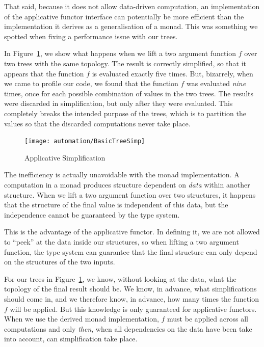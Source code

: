 That said, because it does not allow data-driven computation, an implementation of the applicative functor interface can potentially be more efficient than the implementation it derives as a generalisation of a monad. This was something we spotted when fixing a performance issue with our trees.

In Figure~\ref{fig:ApplicativeSimp}, we show what happens when we lift a two argument function $f$ over two trees with the same topology. The result is correctly simplified, so that it appears that the function $f$ is evaluated exactly five times. But, bizarrely, when we came to profile our code, we found that the function $f$ was evaluated \emph{nine} times, once for each possible combination of values in the two trees. The results were discarded in simplification, but only after they were evaluated. This completely breaks the intended purpose of the trees, which is to partition the values so that the discarded computations never take place.

\begin{figure}
\centering\texttt{[image: automation/BasicTreeSimp]}
\caption{Applicative Simplification}
\label{fig:ApplicativeSimp}
\end{figure}

The inefficiency is actually unavoidable with the monad implementation. A computation in a monad produces structure dependent on \emph{data} within another structure. When we lift a two argument function over two structures, it happens that the structure of the final value is independent of this data, but the independence cannot be guaranteed by the type system.

This is the advantage of the applicative functor. In defining it, we are not allowed to ``peek'' at the data inside our structures, so when lifting a two argument function, the type system can guarantee that the final structure can only depend on the structures of the two inputs. 

For our trees in Figure~\ref{fig:ApplicativeSimp}, we know, without looking at the data, what the topology of the final result should be. We know, in advance, what simplifications should come in, and we therefore know, in advance, how many times the function $f$ will be applied. But this knowledge is only guaranteed for applicative functors. When we use the derived monad implementation, $f$ must be applied across all computations and only \emph{then}, when all dependencies on the data have been take into account,  can simplification take place.

